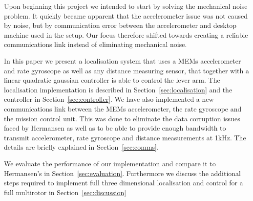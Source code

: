 Upon beginning this project we intended to start by solving the mechanical noise problem. It quickly became apparent that the 
accelerometer issue was not caused by noise, but by communication error between the accelerometer and desktop machine used in the setup.
Our focus therefore shifted towards creating a reliable communications link instead of eliminating mechanical noise.

In this paper we present a localisation system that uses a MEMs accelerometer and rate gyroscope as well as any distance measuring sensor,
that together with a linear quadratic gaussian controller is able to control the lever arm. The localisation implementation is described
in Section~\ref{sec:localisation} and the controller in Section~\ref{sec:controller}.
We have also implemented a new communications 
link between the MEMs accelerometer, the rate gyroscope and the mission control unit. This was done to eliminate the data corruption 
issues faced by Hermansen as well as to be able to provide enough bandwidth to transmit accelerometer, rate gyroscope and distance 
measurements at 1kHz. The details are briefly explained in Section~\ref{sec:comms}. 

We evaluate the performance of our implementation and compare it to Hermansen's in Section~\ref{sec:evaluation}. Furthermore we 
discuss the additional steps required to implement full three dimensional localisation and control for a full multirotor in Section~\ref{sec:discussion}

